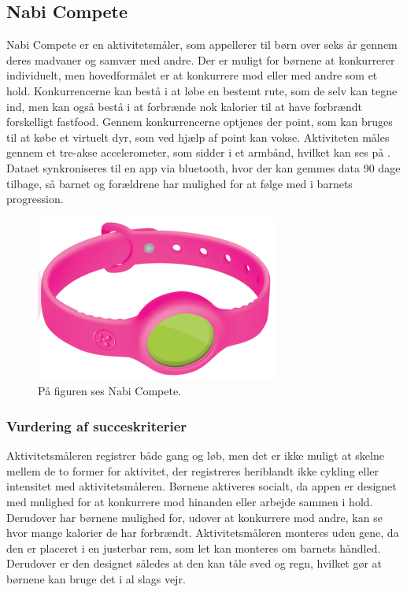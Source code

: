 \subsection{Nabi Compete}
Nabi Compete er en aktivitetsmåler, som appellerer til børn over seks år gennem deres madvaner og samvær med andre. Der er muligt for børnene at konkurrerer individuelt, men hovedformålet er at konkurrere mod eller med andre som et hold. Konkurrencerne kan bestå i at løbe en bestemt rute, som de selv kan tegne ind, men kan også bestå i at forbrænde nok kalorier til at have forbrændt forskelligt fastfood. 
Gennem konkurrencerne optjenes der point, som kan bruges til at købe et virtuelt dyr, som ved hjælp af point kan vokse. 
Aktiviteten måles gennem et tre-akse accelerometer, som sidder i et armbånd, hvilket kan ses på . Dataet synkroniseres til en app via bluetooth, hvor der kan gemmes data 90 dage tilbage, så barnet og forældrene har mulighed for at følge med i barnets progression. \citep{Fuhu_tech2015,Fuhu2015} 
\begin{figure}[H]
	\centering
	\includegraphics[scale=0.9]{figures/aProblemanalyse/nabi.png}
	\caption{På figuren ses Nabi Compete. \citep{Perez2015}}
	\label{fig:nabi}
\end{figure}

\subsubsection{Vurdering af succeskriterier}
Aktivitetsmåleren registrer både gang og løb, men det er ikke muligt at skelne mellem de to former for aktivitet, der registreres heriblandt ikke cykling eller intensitet med aktivitetsmåleren. 
Børnene aktiveres socialt, da appen er designet med mulighed for at konkurrere mod hinanden eller arbejde sammen i hold. Derudover har børnene mulighed for, 
udover at konkurrere mod andre, kan se hvor mange kalorier de har forbrændt. Aktivitetsmåleren monteres uden gene, da den er placeret i en justerbar rem, som let kan monteres om barnets håndled. Derudover er den designet således at den kan tåle sved og regn, hvilket gør at børnene kan bruge det i al slags vejr. 

